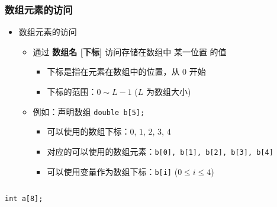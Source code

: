 \begin{frame}[fragile]
    \frametitle{数组元素的访问}

    \begin{overlayarea}{\textwidth}{.55\textheight}
        \begin{itemize}
            \item 数组元素的访问

                \begin{itemize}
                    \item 通过 \textbf{数组名 [下标]} 访问存储在数组中 某一位置 的值
                        \begin{itemize}
                            \item 下标是指在元素在数组中的位置，从 $0$ 开始
                            \item 下标的范围：$0 \sim L - 1$ ($L$ 为数组大小)
                        \end{itemize}
                \end{itemize}

                \begin{itemize}
                    \item<2-> 例如：声明数组 \lstinline|double b[5];|
                        \begin{itemize}
                            \item 可以使用的数组下标：$0$, $1$, $2$, $3$, $4$
                            \item 对应的可以使用的数组元素：\lstinline|b[0], b[1], b[2], b[3], b[4]|
                            \item 可以使用变量作为数组下标：\lstinline|b[i]| ($0 \le i \le 4$)
                        \end{itemize}
                \end{itemize}
        \end{itemize}
    \end{overlayarea}

    \begin{columns}

        \lstinline|int a[8];|

    \end{columns}
\end{frame}
